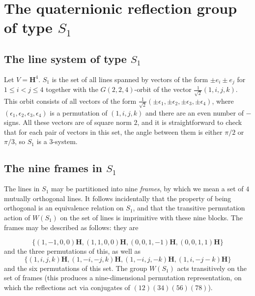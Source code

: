 \documentclass[11pt, reqno]{amsart}
\numberwithin{equation}{section}
\theoremstyle{definition}
\theoremstyle{plain}
\newcommand{\HH}{\mathbf{H}}
\begin{document}
\section{The quaternionic reflection group of type $S_1$}

\subsection{The line system of type $S_1$}

Let $V=\HH^4$. $S_1$ is the set of all lines spanned by vectors of the form $\pm e_i \pm e_j$ for $1 \leq i < j \leq 4$ together with the $G(2,2,4)$-orbit of the vector $\frac{1}{\sqrt{2}}(1,i,j,k)$. This orbit consists of all vectors of the form $\frac{1}{\sqrt{2}}(\pm \epsilon_1,\pm \epsilon_2,\pm \epsilon_3,\pm \epsilon_4)$, where $(\epsilon_1,\epsilon_2,\epsilon_3,\epsilon_4)$ is a permutation of $(1,i,j,k)$ and there are an even number of $-$ signs. All these vectors are of square norm $2$, and it is straightforward to check that for each pair of vectors in this set, the angle between them is either $\pi/2$ or $\pi/3$, so $S_1$ is a $3$-system. 

\subsection{The nine frames in $S_1$} The lines in $S_1$ may be partitioned into nine \emph{frames}, by which we mean a set of $4$ mutually orthogonal lines. It follows incidentally that the property of being orthogonal is an equivalence relation on $S_1$, and that the transitive permutation action of $W(S_1)$ on the set of lines is imprimitive with these nine blocks. The frames may be described as follows: they are

$$\{(1,-1,0,0) \HH ,(1,1,0,0) \HH ,(0,0,1,-1) \HH ,(0,0,1,1) \HH \} $$ and the three permutations of this, as well as
$$\{(1,i,j,k) \HH, (1,-i,-j,k) \HH, (1,-i,j,-k) \HH, (1,i,-j-k) \HH \}$$ and the six permutations of this set. The group $W(S_1)$ acts transitively on the set of frames (this produces a nine-dimensional permutation representation, on which the reflections act via conjugates of $(12)(34)(56)(78)$).
\end{document}
